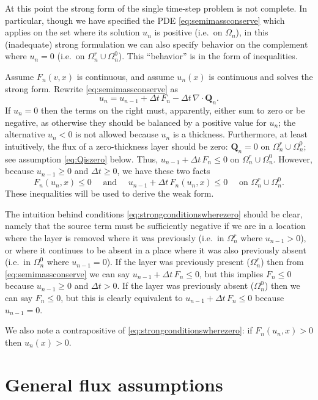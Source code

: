 \documentclass[final,leqno,onefignum,onetabnum]{siamltex1213bueler}
\newcommand\bQ{\mathbf{Q}}
\newcommand{\Div}{\nabla\cdot}
\begin{document}
At this point the strong form of the single time-step problem is not complete.  In particular, though we have specified the PDE \eqref{eq:semimassconserve} which applies on the set where its solution $u_n$ is positive (i.e.~on $\Omega_n$), in this (inadequate) strong formulation we can also specify behavior on the complement where $u_n=0$ (i.e.~on $\Omega_n^r \cup \Omega_n^0$).  This ``behavior'' is in the form of inequalities.

Assume $F_n(v,x)$ is continuous, and assume $u_n(x)$ is continuous and solves the strong form.  Rewrite \eqref{eq:semimassconserve} as
    $$u_n = u_{n-1} + \Delta t\, F_n - \Delta t\, \Div \bQ_n.$$
If $u_n=0$ then the terms on the right must, apparently, either sum to zero or be negative, as otherwise they should be balanced by a positive value for $u_n$; the alternative $u_n<0$ is not allowed because $u_n$ is a thickness.  Furthermore, at least intuitively, the flux of a zero-thickness layer should be zero: $\bQ_n=0$ on $\Omega_n^r \cup \Omega_n^0$; see assumption \eqref{eq:Qiszero} below.  Thus, $u_{n-1}+\Delta t\, F_n \le 0$ on $\Omega_n^r \cup \Omega_n^0$.  However, because $u_{n-1}\ge 0$ and $\Delta t\ge 0$, we have these two facts
\begin{equation}
F_n(u_n,x) \le 0 \quad \text{ and } \quad u_{n-1} + \Delta t\, F_n(u_n,x) \le 0 \quad \text{ on } \Omega_n^r \cup \Omega_n^0. \label{eq:strongconditionswherezero}
\end{equation}
These inequalities will be used to derive the weak form.

The intuition behind conditions \eqref{eq:strongconditionswherezero} should be clear, namely that the source term must be sufficiently negative if we are in a location where the layer is removed where it was previously (i.e.~in $\Omega_n^r$ where $u_{n-1}>0$), or where it continues to be absent in a place where it was also previously absent (i.e.~in $\Omega_n^0$ where $u_{n-1}=0$).  If the layer was previously present ($\Omega_n^r$) then from \eqref{eq:semimassconserve} we can say $u_{n-1} + \Delta t\, F_n \le 0$, but this implies $F_n\le 0$ because $u_{n-1}\ge 0$ and $\Delta t>0$.  If the layer was previously absent ($\Omega_n^0$) then we can say $F_n\le 0$, but this is clearly equivalent to $u_{n-1} + \Delta t\, F_n \le 0$ because $u_{n-1}=0$.

We also note a contrapositive of \eqref{eq:strongconditionswherezero}: if $F_n(u_n,x)>0$ then $u_n(x)>0$.


\section{General flux assumptions} \label{sec:fluxassumptions}
\end{document}
